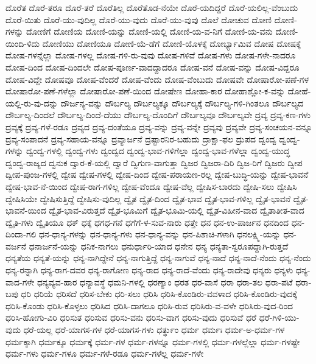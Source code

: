 {ದೊರೆತ
ದೊರೆ-ತರೂ
ದೊರೆ-ತರೆ
ದೊರೆತಿಲ್ಲ
ದೊರೆತೊಡ-ನೆಯೇ
ದೊರೆ-ಯದಿದ್ದರೆ
ದೊರೆ-ಯಲಿಲ್ಲ-ವೆಂಬುದು
ದೊರೆ-ಯಿತು
ದೊರೆ-ಯು-ವುದಿಲ್ಲ
ದೊರೆ-ಯು-ವುದು
ದೊರೆ-ಯು-ವುವು
ದೊಲೆ
ದೋಚುವ
ದೋಣಿ
ದೋಣಿ-ಗಳನ್ನು
ದೋಣಿಗೆ
ದೋಣಿಯ
ದೋಣಿ-ಯನ್ನು
ದೋಣಿ-ಯಲ್ಲಿ
ದೋಣಿ-ಯ-ವ-ನಿಗೆ
ದೋಣಿ-ಯ-ವನು
ದೋಣಿ-ಯಿಂದಿ-ಳಿದು
ದೋಣಿಯು
ದೋಣಿಯೂ
ದೋಣಿ-ಯೆ-ಡೆಗೆ
ದೋಣಿ-ಯೊಳಕ್ಕೆ
ದೋರ್ಭ್ಯಾಮಿವ
ದೋಷ
ದೋಷಕ್ಕೆ
ದೋಷ-ಗಳನ್ನೆಲ್ಲಾ
ದೋಷ-ಗಳಲ್ಲ
ದೋಷ-ಗಳಿ-ರು-ವುವು
ದೋಷ-ಗಳಿವೆ
ದೋಷ-ಗಳು
ದೋಷ-ಗಳೇ-ನಾದರೂ
ದೋಷ-ದಿಂದ
ದೋಷ-ದಿಂದಲೇ
ದೋಷ-ಪೂರ್ಣ-ವಾದದ್ದಾದರೂ
ದೋಷ-ವನೆ
ದೋಷ-ವನ್ನು
ದೋಷ-ವಿದ್ದರೂ
ದೋಷ-ವಿದ್ದೇ
ದೋಷವೂ
ದೋಷ-ವೆಂದರೆ
ದೋಷ-ವೆಂದು
ದೋಷ-ವೆಂಬುದು
ದೋಷವೇ
ದೋಷಾರೋ-ಪಣೆ-ಗಳ
ದೋಷಾರೋ-ಪಣೆ-ಗಳೆಲ್ಲಾ
ದೋಷಾರೋ-ಪಣೆ-ಯಿಂದ
ದೋಷೇಣ
ದೋಹಾ-ಕಾರ
ದೋಹಾಶ್ಲೋ-ಕ-ವನ್ನು
ದೋಹೆ-ಯಲ್ಲಿ-ರು-ವು-ದನ್ನು
ದೌರ್ಜನ್ಯ-ವನ್ನು
ದೌರ್ಬಲ್ಯ
ದೌರ್ಬಲ್ಯಕ್ಕೂ
ದೌರ್ಬಲ್ಯಕ್ಕೆ
ದೌರ್ಬಲ್ಯ-ಗಳಿ-ಗಿಂತಲೂ
ದೌರ್ಬಲ್ಯದ
ದೌರ್ಬಲ್ಯ-ದಿಂದಲೆ
ದೌರ್ಬಲ್ಯ-ದಿಂದೆ-ದೆಯು
ದೌರ್ಬಲ್ಯ-ದೊಂದಿಗೆ
ದೌರ್ಬಲ್ಯವೂ
ದೌರ್ಬಲ್ಯವೇ
ದ್ರವ್ಯ
ದ್ರವ್ಯ-ಕಣ-ಗಳು
ದ್ರವ್ಯಕ್ಕೆ
ದ್ರವ್ಯ-ಗಳೆ-ರಡೂ
ದ್ರವ್ಯದ
ದ್ರವ್ಯ-ದಂತೆಯೂ
ದ್ರವ್ಯ-ವನ್ನು
ದ್ರವ್ಯ-ವನ್ನೇ
ದ್ರವ್ಯವು
ದ್ರವ್ಯವೇ
ದ್ರವ್ಯ-ಸಂಚಯನ-ವನ್ನೂ
ದ್ರವ್ಯ-ಸಂಪಾದನೆ
ದ್ರವ್ಯ-ಸಹಾಯ-ವನ್ನೂ
ದ್ರವ್ಯಾರ್ಜನೆ
ದ್ರಷ್ಟಾರನಿರ-ಬಹುದು
ದ್ರಾಕ್ಷಾ-ಫಲ
ದ್ರುಪದ
ದ್ವಂದ್ವ
ದ್ವಂದ್ವ-ಗಳನ್ನು
ದ್ವಂದ್ವ-ಗಳಲ್ಲಿ
ದ್ವಂದ್ವ-ಗಳು
ದ್ವಂದ್ವದ
ದ್ವಂದ್ವ-ಭಾವ-ಗಳಿಗೆಲ್ಲಾ
ದ್ವಂದ್ವ-ಭಾವ-ಗಳೆಲ್ಲಾ
ದ್ವಂದ್ವ-ಯುದ್ಧ
ದ್ವಂದ್ವ-ರಾಜ್ಯದ
ದ್ವನುಕ
ದ್ವಾರ-ಕೆ-ಯಲ್ಲಿ
ದ್ವಾರೆ
ದ್ವಿಗುಣ-ವಾಗುತ್ತಾ
ದ್ವಿಜರ
ದ್ವಿಜರಾ-ದಿರಿ
ದ್ವಿಜ-ರಿಗೆ
ದ್ವಿಜರು
ದ್ವೀಪ
ದ್ವೀಪ-ಪುಂಜ-ಗಳಲ್ಲಿ
ದ್ವೇಷ
ದ್ವೇಷ-ಗಳಲ್ಲಿ
ದ್ವೇಷ-ದಿಂದ
ದ್ವೇಷ-ಪರಾಯಣ-ರಲ್ಲ
ದ್ವೇಷ-ಬುದ್ಧಿ-ಯನ್ನು
ದ್ವೇಷ-ಭಾವನೆ
ದ್ವೇಷ-ಭಾವ-ನೆ-ಯಿಂದ
ದ್ವೇಷ-ರಾಗ-ಗಳಿಲ್ಲ
ದ್ವೇಷ-ವೆಂದೂ
ದ್ವೇಷ-ವೆಲ್ಲ
ದ್ವೇಷಿಸ-ಬಾರದು
ದ್ವೇಷಿ-ಸಲು
ದ್ವೇಷಿಸಿ
ದ್ವೇಷಿಸಿಯೇ
ದ್ವೇಷಿಸುತ್ತಿದ್ದೆ
ದ್ವೇಷಿಸು-ವುದಿಲ್ಲ
ದ್ವೈತ
ದ್ವೈತ-ದಿಂದ
ದ್ವೈತ-ಭಾವ
ದ್ವೈತ-ಭಾವ-ಗಳಿಲ್ಲ
ದ್ವೈತ-ಭಾವನೆ
ದ್ವೈತ-ಭಾವನೆ-ಯಿಂದ
ದ್ವೈತ-ಭಾವ-ವಿರುತ್ತದೆ
ದ್ವೈತ-ಭೂಮಿಗೆ
ದ್ವೈತ-ಭೂಮಿ-ಯಲ್ಲಿ
ದ್ವೈತ-ವಿಹೀನ-ವಾದ
ದ್ವೈತಾತೀತ-ವಾದ
ದ್ವೈತಿ-ಗಳು
ದ್ವೈತಿಯೂ
ಧಕ್
ಧಕ್ಕೆ
ಧಗಧ-ಗನೆ
ಧಗೆಗೆ-ಳ-ಸುವ-ನಾರು
ಧತ್ತೇ
ಧನ
ಧನ-ಉ-ಪಾರ್ಜನ
ಧನದಿಂದ
ಧನ-ದಿಂದಾ-ಗಲಿ
ಧನ-ಧಾನ್ಯ-ಗಳನ್ನು
ಧನ-ಧಾನ್ಯ-ಗಳು
ಧನ-ಧಾನ್ಯ-ವನ್ನು
ಧನ-ಪಿಶಾಚಿ-ಗಳಾಗಿ
ಧನಲಕ್ಷ್ಮಿ-ಯನ್ನು
ಧನ-ವರ್ಜನೆ
ಧನಾರ್ಜನೆ-ಯನ್ನು
ಧನಿಕ-ನಾಗಲು
ಧನುರ್ಧಾರಿ-ಯಾದ
ಧನೇನ
ಧನ್ಯ
ಧನ್ಯತಾ-ಸ್ವರೂಪದ್ದಾಗಿ-ರುತ್ತದೆ
ಧನ್ಯತೆಯ
ಧನ್ಯತೆ-ಯನ್ನು
ಧನ್ಯ-ನಾಗಿದ್ದೇನೆ
ಧನ್ಯ-ನಾಗುತ್ತಿದ್ದೆ
ಧನ್ಯ-ನಾಗುವೆ
ಧನ್ಯ-ನಾದೆ
ಧನ್ಯ-ನಾದೆ-ನೆಂದು
ಧನ್ಯ-ನೆಂದು
ಧನ್ಯ-ರನ್ನಾಗಿ
ಧನ್ಯ-ರಾಗ-ದವರ
ಧನ್ಯ-ರಾಗೋಣ
ಧನ್ಯ-ರಾದ
ಧನ್ಯ-ರಾದೆ-ವೆಂದು
ಧನ್ಯ-ರಾದೇವು
ಧನ್ಯರು
ಧನ್ಯಳು
ಧನ್ಯ-ವಾದ-ಗಳೇ
ಧನ್ಯವ್ಯವ-ಹಾರ
ಧನ್ಯಾವಸ್ಥೆ
ಧಮನಿ-ಗಳಲ್ಲಿ
ಧರಣ್ಯಾಂ
ಧರತ
ಧರ-ವಾಸೆ
ಧರಾ
ಧರಾ-ತಲ
ಧರಾ-ಪಟೆ
ಧರಾ-ಬಪು
ಧರಿ
ಧರಿಯೆ
ಧರಿಸದೆ
ಧರಿಸ-ಬೇಕು
ಧರಿ-ಸಲು
ಧರಿಸಿ
ಧರಿಸಿ-ಕೊಂಡಿರು-ವವಳಾದ
ಧರಿಸಿ-ಕೊಂಡಿರು-ವುದಕ್ಕೆ
ಧರಿಸಿ-ಕೊಂಡು
ಧರಿಸಿ-ಕೊಳ್ಳಲು
ಧರಿಸಿದ
ಧರಿಸಿ-ದಾಗಲೂ
ಧರಿಸಿ-ರುವ
ಧರಿಸಿರು-ವ-ವಳೇ
ಧರಿಸಿರು-ವುದ-ರಿಂದ
ಧರಿಸಿ-ಹೋಗು-ವಿರಿ
ಧರಿಸುತ
ಧರಿಸುವ
ಧರಿಸು-ವನು
ಧರಿಸು-ವಾಗ
ಧರಿಸು-ವುದು
ಧರಿಸುವೆ
ಧರೆ
ಧರೆ-ಗಿಳಿ-ಯು-ವುದು
ಧರೆ-ಯಲ್ಲ
ಧರೆ-ಯಾಗಸ-ಗಳ
ಧರೆ-ಯಾಗಸ-ಗಳು
ಧರ್ತ್ಥುಂ
ಧರ್ಮ
ಧರ್ಮಃ
ಧರ್ಮ-ಅ-ಧರ್ಮ-ಗಳ
ಧರ್ಮಕ್ಕಾಗಿ
ಧರ್ಮಕ್ಕೂ
ಧರ್ಮಕ್ಕೆ
ಧರ್ಮ-ಗಳ
ಧರ್ಮ-ಗಳನ್ನೂ
ಧರ್ಮ-ಗಳಲ್ಲಿ
ಧರ್ಮ-ಗಳಲ್ಲೆಲ್ಲಾ
ಧರ್ಮ-ಗಳಷ್ಟೇ
ಧರ್ಮ-ಗಳು
ಧರ್ಮ-ಗಳೂ
ಧರ್ಮ-ಗಳೆ-ರಡೂ
ಧರ್ಮ-ಗಳೆಲ್ಲ
ಧರ್ಮ-ಗಳೇ
}
